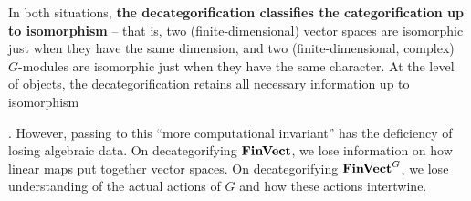 \par In both situations, \textbf{the decategorification classifies the categorification up to isomorphism} -- that is, two (finite-dimensional) vector spaces are isomorphic just when they have the same dimension, and two (finite-dimensional, complex) $G$-modules are isomorphic just when they have the same character. At the level of objects, the decategorification retains all necessary information up to isomorphism . However, passing to this ``more computational invariant'' has the deficiency of losing algebraic data. On decategorifying $\operatorname{\mathbf{FinVect}}$, we lose information on how linear maps put together vector spaces. On decategorifying $\operatorname{\mathbf{FinVect}}^G$, we lose understanding of the actual actions of $G$ and how these actions intertwine.

\skoop
